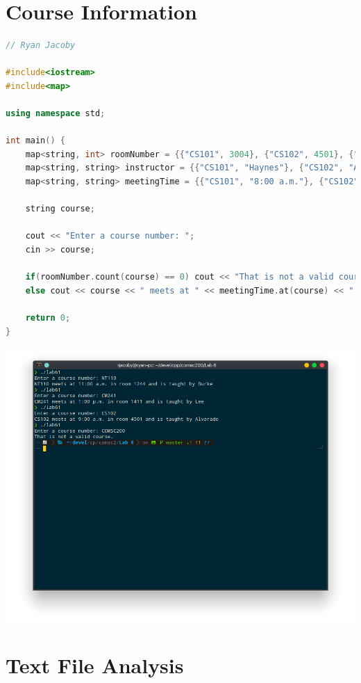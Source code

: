 \documentclass[letterpaper, 11pt]{article}
\begin{document}
\section{Course Information}

\begin{lstlisting}[language=c++, caption=main.cpp]
// Ryan Jacoby

#include<iostream>
#include<map>

using namespace std;

int main() {
    map<string, int> roomNumber = {{"CS101", 3004}, {"CS102", 4501}, {"CS103", 6755}, {"NT110", 1244}, {"CM241", 1411}};
    map<string, string> instructor = {{"CS101", "Haynes"}, {"CS102", "Alvarado"}, {"CS103", "Rich"}, {"NT110", "Burke"}, {"CM241", "Lee"}};
    map<string, string> meetingTime = {{"CS101", "8:00 a.m."}, {"CS102", "9:00 a.m."}, {"CS103", "10:00 a.m."}, {"NT110", "11:00 a.m."}, {"CM241", "1:00 p.m."}};

    string course;

    cout << "Enter a course number: ";
    cin >> course;

    if(roomNumber.count(course) == 0) cout << "That is not a valid course.\n";
    else cout << course << " meets at " << meetingTime.at(course) << " in room " << roomNumber.at(course) << " and is taught by " << instructor.at(course) << '\n';

    return 0;
}
\end{lstlisting}

\includegraphics[scale=0.5]{courses.png}

\section{Text File Analysis}
\end{document}
